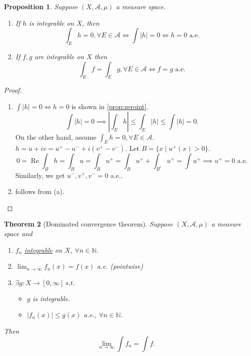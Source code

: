 \documentclass{report}
\newcommand{\N}{\mathbb{N}}
\newcommand{\st}{\ s.t.\ }
\def \re {\operatorname{Re}}
\newtheorem{theorem}{Theorem}[chapter]
\newtheorem{proposition}[theorem]{Proposition}
\theoremstyle{definition}
\theoremstyle{remark}
\begin{document}
\begin{proposition}
	Suppose $(X, \mathcal{A}, \mu)$ a measure space.
	\begin{enumerate}
		\item If $h$ is integrable on $X$, then \[\int_E h = 0, \forall E \in \mathcal{A} \iff \int |h| = 0 \iff h = 0\text{ a.e.}\]
		\item If $f, g$ are integrable on $X$ then \[\int_E f = \int_E g, \forall E \in \mathcal{A} \iff f = g\text{ a.e.}\]
	\end{enumerate}
\end{proposition}
\begin{proof}
	\begin{enumerate}
		\item $\int |h| = 0 \iff h = 0$ is shown in \ref{prop:zeroint}.
		\[
			\int |h| = 0 \implies \left|\int_E h\right| \leq \int_E |h| \leq \int |h| = 0.
		\]
		On the other hand, assume $\int_E h = 0, \forall E \in \mathcal{A}$. $h = u + iv = u^+ - u^- + i(v^+ - v^-)$. Let $B = \{x \mid u^+(x) > 0\}$.
		\[0 = \re\int_B h = \int_B u = \int_B u^+ = \int_B u^+ + \int_{B^c} u^+ = \int u^+ \implies u^+ = 0 \text{ a.e.}\]
		Similarly, we get $u^-, v^+, v^- = 0$ a.e..
		\item follows from (a). \qedhere
	\end{enumerate}
\end{proof}
\begin{theorem}[Dominated convergence theorem]
	Suppose $(X, \mathcal{A}, \mu)$ a measure space and
	\begin{enumerate}
		\item $f_n$ \underline{integrable} on $X$, $\forall n \in \N$.
		\item $\displaystyle \lim_{n \to \infty} f_n(x) = f(x)$ a.e. (pointwise)
		\item $\exists g: X \to [0, \infty] \st$ \begin{itemize}
			\item $g$ is integrable.
			\item $|f_n(x)| \leq g(x)$ a.e., $\forall n \in \N$.
		\end{itemize}
	\end{enumerate}
	Then \[\lim_{n \to \infty} \int f_n = \int f.\]
\end{theorem}
\end{document}
